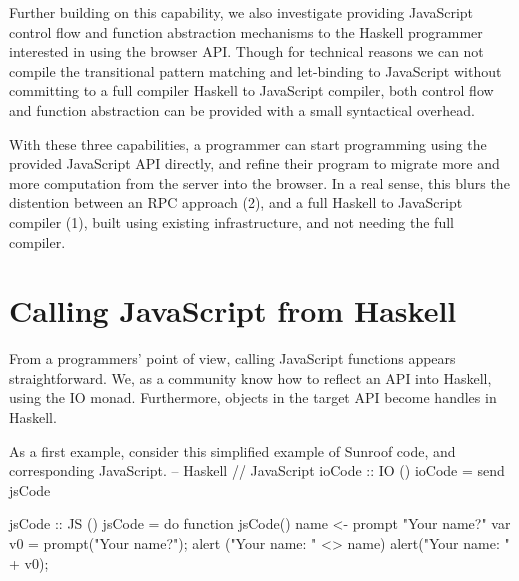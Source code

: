 \documentclass{llncs}
\newenvironment{Code}{\verbatim}{\endverbatim}
\begin{document}
Further building on this capability, we also investigate providing
JavaScript control flow and function abstraction mechanisms
to the Haskell programmer interested in using the browser API.
Though for technical reasons we can not compile the transitional
pattern matching and let-binding to JavaScript without committing
to a full compiler Haskell to JavaScript compiler, both
control flow and function abstraction can be provided
with a small syntactical overhead.

With these three capabilities, a programmer can start programming
using the provided JavaScript API directly, and refine
their program to migrate more and more computation
from the server into the browser. In a real sense,
this blurs the distention between an RPC approach (2),
and a full Haskell to JavaScript compiler (1),
built using existing infrastructure, and not needing
the full compiler.




\begin{comment}
\section{Example Sunroof Program}
\label{sec:simple-example}

A simple drawing program, that we build up step by step.
Perhaps bouncing ball.
Perhaps drawing line.
\end{comment}


\section{Calling JavaScript from Haskell}
\label{sec:js-rpc}

From a programmers' point of view, calling JavaScript functions
appears straightforward. We, as a community know how to reflect an
API into Haskell, using the IO monad. Furthermore, objects in
the target API become handles in Haskell. 

As a first example, consider this simplified example of Sunroof code, and corresponding JavaScript.
\noindent
\begin{Code}
-- Haskell                          // JavaScript
ioCode :: IO ()
ioCode = send jsCode

jsCode :: JS ()
jsCode = do                        function jsCode() {
   name <- prompt "Your name?"       var v0 = prompt("Your name?"); 
   alert ("Your name: " <> name)     alert("Your name: " + v0); 
                                   }
\end{Code}%
\end{document}

